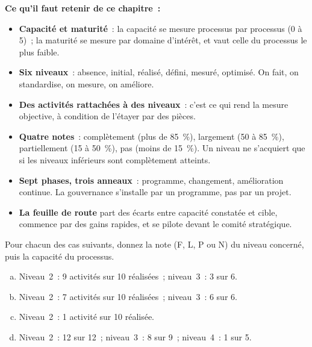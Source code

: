 \begin{boxresume}
\textbf{Ce qu'il faut retenir de ce chapitre~:}
\begin{itemize}
    \item \textbf{Capacité et maturité}~: la capacité se mesure processus
          par processus (0 à 5)~; la maturité se mesure par domaine
          d'intérêt, et vaut celle du processus le plus faible.
    \item \textbf{Six niveaux}~: absence, initial, réalisé, défini, mesuré,
          optimisé. On fait, on standardise, on mesure, on améliore.
    \item \textbf{Des activités rattachées à des niveaux}~: c'est ce qui rend
          la mesure objective, à condition de l'étayer par des pièces.
    \item \textbf{Quatre notes}~: complètement (plus de 85~\%), largement
          (50 à 85~\%), partiellement (15 à 50~\%), pas (moins de 15~\%).
          Un niveau ne s'acquiert que si les niveaux inférieurs sont
          complètement atteints.
    \item \textbf{Sept phases, trois anneaux}~: programme, changement,
          amélioration continue. La gouvernance s'installe par un
          programme, pas par un projet.
    \item \textbf{La feuille de route} part des écarts entre capacité
          constatée et cible, commence par des gains rapides, et se pilote
          devant le comité stratégique.
\end{itemize}
\end{boxresume}

\bigskip

\begin{boxexo}[title={\ding{45}\quad Exercice~8.1. Noter un niveau \niveaubase}]
Pour chacun des cas suivants, donnez la note (F, L, P ou N) du niveau
concerné, puis la capacité du processus.
\begin{enumerate}[(a)]
    \item Niveau~2~: 9 activités sur 10 réalisées~; niveau~3~: 3 sur 6.
    \item Niveau~2~: 7 activités sur 10 réalisées~; niveau~3~: 6 sur 6.
    \item Niveau~2~: 1 activité sur 10 réalisée.
    \item Niveau~2~: 12 sur 12~; niveau~3~: 8 sur 9~; niveau~4~: 1 sur 5.
\end{enumerate}
\end{boxexo}

